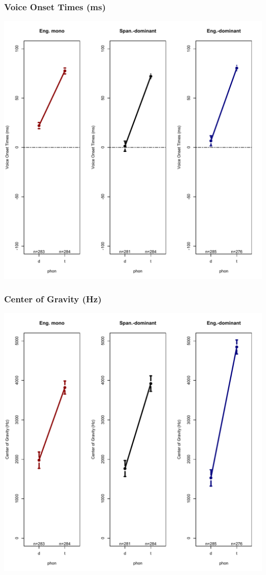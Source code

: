 \documentclass{beamer}
\begin{document}
\begin{frame}
\frametitle{Voice Onset Times (ms)}
\begin{center}
\includegraphics[scale=.375]{simplified/fig07_votenglish.pdf}
\end{center}
\end{frame}

\begin{frame}
\frametitle{Center of Gravity (Hz)}
\begin{center}
\includegraphics[scale=.375]{simplified/fig08_cogenglish.pdf}
\end{center}
\end{frame}
\end{document}
